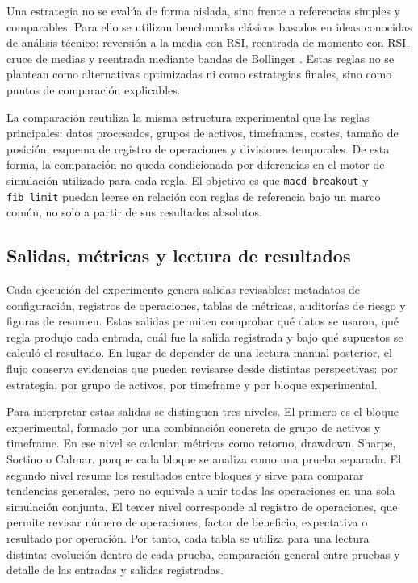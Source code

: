 Una estrategia no se eval\'ua de forma aislada, sino frente a referencias
simples y comparables. Para ello se utilizan benchmarks cl\'asicos basados en
ideas conocidas de an\'alisis t\'ecnico: reversi\'on a la media con RSI, reentrada
de momento con RSI, cruce de medias y reentrada mediante bandas de Bollinger
\cite{wilder_1978_new_concepts,murphy_1999_technical_analysis,
bollinger_2001_bands}. Estas reglas no se plantean como alternativas
optimizadas ni como estrategias finales, sino como puntos de comparaci\'on
explicables.

La comparaci\'on reutiliza la misma estructura experimental que las reglas
principales:
datos procesados, grupos de activos, timeframes, costes, tama\~no de
posici\'on, esquema de registro de operaciones y divisiones temporales. De esta
forma, la comparaci\'on no queda condicionada por diferencias en el motor de
simulaci\'on utilizado para cada regla. El objetivo es que \texttt{macd\_breakout} y
\texttt{fib\_limit} puedan leerse en relaci\'on con reglas de referencia bajo un
marco com\'un, no solo a partir de sus resultados absolutos.

\subsection{Salidas, m\'etricas y lectura de resultados}
\label{subsec:salidas-metricas-backtesting}

Cada ejecuci\'on del experimento genera salidas revisables: metadatos de configuraci\'on,
registros de operaciones, tablas de m\'etricas, auditor\'ias de riesgo y figuras
de resumen. Estas salidas permiten comprobar qu\'e datos se usaron, qu\'e regla
produjo cada entrada, cu\'al fue la salida registrada y bajo qu\'e supuestos se
calcul\'o el resultado. En lugar de depender de una lectura manual posterior, el
flujo conserva evidencias que pueden revisarse desde distintas perspectivas:
por estrategia, por grupo de activos, por timeframe y por bloque
experimental.

Para interpretar estas salidas se distinguen tres niveles. El primero es el
bloque experimental, formado por una combinaci\'on concreta de grupo de activos
y timeframe. En ese nivel se calculan m\'etricas como retorno, drawdown,
Sharpe, Sortino o Calmar, porque cada bloque se analiza como una prueba
separada. El segundo nivel resume los resultados entre bloques y sirve para
comparar tendencias generales, pero no equivale a unir todas las operaciones en
una sola simulaci\'on conjunta. El tercer nivel corresponde al registro de
operaciones, que permite revisar n\'umero de operaciones, factor de beneficio,
expectativa o resultado por operaci\'on. Por tanto, cada tabla se utiliza para
una lectura distinta: evoluci\'on dentro de cada prueba, comparaci\'on general
entre pruebas y detalle de las entradas y salidas registradas.

